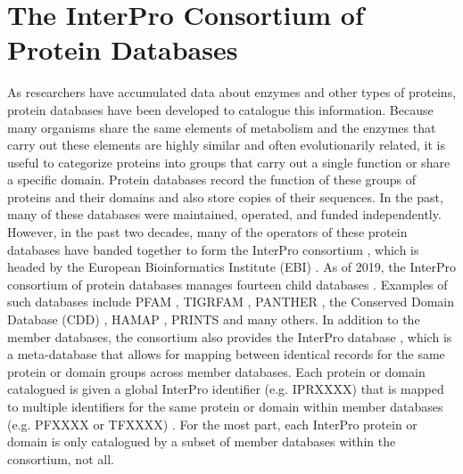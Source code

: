 \section{The InterPro Consortium of Protein Databases} \label{InterProDatabases}

As researchers have accumulated data about enzymes and other types of proteins, protein databases have been developed to catalogue this information. Because many organisms share the same elements of metabolism and the enzymes that carry out these elements are highly similar and often evolutionarily related, it is useful to categorize proteins into groups that carry out a single function or share a specific domain. Protein databases record the function of these groups of proteins and their domains and also store copies of their sequences. In the past, many of these databases were maintained, operated, and funded independently. However, in the past two decades, many of the operators of these protein databases have banded together to form the InterPro consortium \cite{apweiler2000interpro,hunter2008interpro,Hunter2009}, which is headed by the European Bioinformatics Institute (EBI) \cite{cook2015european,finn2016interpro}. As of 2019, the InterPro consortium of protein databases manages fourteen child databases \cite{finn2016interpro,Hunter2009}. Examples of such databases include PFAM \cite{bateman2004pfam}, TIGRFAM \cite{Haft2013}, PANTHER \cite{mi2005panther}, the Conserved Domain Database (CDD) \cite{marchler2014cdd}, HAMAP \cite{lima2008hamap}, PRINTS \cite{attwood2000prints} and many others. In addition to the member databases, the consortium also provides the InterPro database \cite{hunter2008interpro,finn2016interpro}, which is a meta-database that allows for mapping between identical records for the same protein or domain groups across member databases. Each protein or domain catalogued is given a global InterPro identifier (e.g. IPRXXXX) that is mapped to multiple identifiers for the same protein or domain within member databases (e.g. PFXXXX or TFXXXX) \cite{hunter2008interpro,finn2016interpro}. For the most part, each InterPro protein or domain is only catalogued by a subset of member databases within the consortium, not all.

